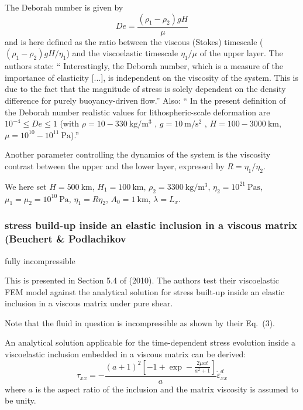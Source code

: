The Deborah number is given by
\[
De=\frac{(\rho_1-\rho_2)g H}{\mu}
\]
and is here defined as the ratio between the viscous (Stokes) timescale ($(\rho_1-\rho_2)g H/\eta_1$)
and the viscoelastic timescale $\eta_1/\mu$ of the upper layer.
The authors state: ``
Interestingly, the Deborah number, which is a measure of the importance of
elasticity [...], is independent on the viscosity of the system. 
This is due to the fact that the magnitude of stress is solely
dependent on the density difference for purely buoyancy-driven flow.''
Also: ``
In the present definition of the Deborah number realistic values for 
lithospheric-scale deformation are $10^{-4} \le De \le 1$ 
(with $\rho =10-330~\si{\kg\per\cubic\meter}$ , 
$g = 10~\si{\meter\per\square\second}$ , $H = 100-3000~\si{\km}$, 
$\mu=10^{10}-10^{11}~\si{\pascal}$).''

Another parameter controlling the dynamics of the system is the viscosity contrast 
between the upper and the lower layer, expressed by $R=\eta_1/\eta_2$.

We here set $H=500~\si{\km}$, $H_1=100~\si{\km}$,
$\rho_2=3300~\si{\kg\per\cubic\meter}$, $\eta_2=10^{21}~\si{\pascal\second}$,
$\mu_1=\mu_2=10^{10}~\si{\pascal}$, $\eta_1=R\eta_2$,
$A_0=1~\si{\km}$, $\lambda=L_x$.







\subsubsection{stress build-up inside an elastic inclusion in a viscous matrix (Beuchert \& Podlachikov}

{\color{orange} fully incompressible}

This is presented in Section 5.4 of \textcite{bepo10} (2010).
The authors test their viscoelastic FEM model against the analytical solution 
for stress built-up inside an elastic inclusion in a viscous matrix under pure shear. 


Note that the fluid in question is incompressible as shown by their Eq.~(3).

An analytical solution applicable for the time-dependent stress evolution inside 
a viscoelastic inclusion embedded in a viscous matrix can be derived:
\[
\tau_{xx} = -\frac{(a+1)^2 \left[-1+\exp -\frac{2\mu a t }{a^2+1}  \right]}{a} \dot\varepsilon^d_{xx}
\]
where $a$ is the aspect ratio of the inclusion and the matrix viscosity is assumed to be unity.

